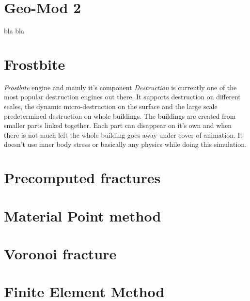 \section{Geo-Mod 2}
bla bla

\section{Frostbite}
\emph{Frostbite} \cite{frostbite} engine and mainly it's component \emph{Destruction} \cite{destruction} is currently one of the most popular destruction engines out there. It supports destruction on different scales, the dynamic micro-destruction on the surface and the large scale predetermined destruction on whole buildings. The buildings are created from smaller parts linked together. Each part can disappear on it's own and when there is not much left the whole building goes away under cover of animation. 
It doesn't use inner body stress or basically any physics while doing this simulation.

\section{Precomputed fractures}

\section{Material Point method}

\section{Voronoi fracture}

\section{Finite Element Method}
